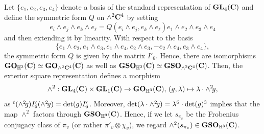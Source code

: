 \documentclass[11pt, reqno]{amsart}
\theoremstyle{plain}
\theoremstyle{definition}
\theoremstyle{remark}
\theoremstyle{plain}
\def\C{{\bf C}}
\def\GO{{\mathbf{GO}}}
\def\GSO{{\mathbf{GSO}}}
\def\GL{\mathbf{GL}}
\begin{document}
    

Let $\{ e_1, e_2, e_3, e_4\}$ denote a basis of the standard representation of $\GL_4(\C)$ and define the symmetric form $Q$ on $\wedge^2 \C^4$ by setting  $$e_i \wedge e_j \wedge e_k \wedge e_\ell = Q(e_i \wedge e_j , e_k \wedge e_\ell) e_1 \wedge e_2 \wedge e_3 \wedge e_4$$ and then extending it by linearity. With respect to the basis  $$\{ e_1 \wedge e_2, e_1 \wedge e_3, e_1 \wedge e_4, e_2 \wedge e_3, -e_2 \wedge e_4, e_3 \wedge e_4\},$$ the symmetric form $Q$ is given by the matrix $I'_6$. Hence, there are isomorphisms $\GO_{\mathbb{H}^3}(\C) \simeq \GO_{\wedge^2 \C^4}(\C)$ as well as  $\GSO_{\mathbb{H}^3}(\C) \simeq \GSO_{\wedge^2 \C^4}(\C)$. Then, the exterior square representation defines a morphism \[ \wedge^2: \GL_4(\C) \times \GL_1(\C) \to \GO_{\mathbb{H}^3}(\C),\, (g,\lambda) \mapsto \lambda \cdot \wedge^2\!g,\] as $^t(\wedge^2\!g)I_6'(\wedge^2\!g)= {\rm det}(g)I_6'$. Moreover, ${\rm det}(\lambda \cdot \wedge^2\!g)= \lambda^6\cdot {\rm det}(g)^3$ implies that the map $\wedge^2$ factors through $\GSO_{\mathbb{H}^3}(\C)$. Hence, if we let $s_{\pi_v}$ be the Frobenius conjugacy class of $\pi_v$ (or rather $\pi'_v \otimes \chi_v$), we regard $\wedge^2(s_{\pi_v}) \in \GSO_{\mathbb{H}^3}(\C)$.
\end{document}
